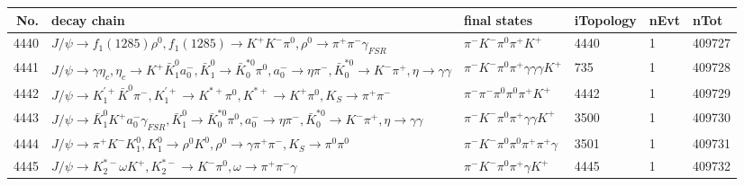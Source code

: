 \begin{table}[htbp] 
\begin{center}
\begin{small}
\begin{tabular}{rlllll}\hline\hline
 No. & decay chain & final states &  iTopology & nEvt & nTot \\\hline
4440&$J/\psi       \rightarrow f_{1}(1285)    \rho^{0}      , f_{1}(1285)     \rightarrow K^{+}          K^{-}          \pi^{0}        , \rho^{0}       \rightarrow \pi^{+}        \pi^{-}        \gamma_{FSR} $&$\pi^{-}        K^{-}          \pi^{0}        \pi^{+}        K^{+}          $& 4440&    1&409727\\
4441&$J/\psi       \rightarrow \gamma       \eta_{c}    , \eta_{c}     \rightarrow K^{+}          \bar{K}_1^{0} a_{0}^{-}      , \bar{K}_1^{0}  \rightarrow \bar{K}_0^{*0}\pi^{0}        , a_{0}^{-}       \rightarrow \eta          \pi^{-}        , \bar{K}_0^{*0} \rightarrow K^{-}          \pi^{+}        , \eta           \rightarrow \gamma       \gamma       $&$\pi^{-}        K^{-}          \pi^{0}        \pi^{+}        \gamma       \gamma       \gamma       K^{+}          $&  735&    1&409728\\
4442&$J/\psi       \rightarrow K_1^{'+}      \bar{K}^{0}   \pi^{-}        , K_1^{'+}       \rightarrow K^{*+}         \pi^{0}        , K^{*+}          \rightarrow K^{+}          \pi^{0}        , K_{S}           \rightarrow \pi^{+}        \pi^{-}        $&$\pi^{-}        \pi^{-}        \pi^{0}        \pi^{0}        \pi^{+}        K^{+}          $& 4442&    1&409729\\
4443&$J/\psi       \rightarrow \bar{K}_1^{0} K^{+}          a_{0}^{-}      \gamma_{FSR} , \bar{K}_1^{0}  \rightarrow \bar{K}_0^{*0}\pi^{0}        , a_{0}^{-}       \rightarrow \eta          \pi^{-}        , \bar{K}_0^{*0} \rightarrow K^{-}          \pi^{+}        , \eta           \rightarrow \gamma       \gamma       $&$\pi^{-}        K^{-}          \pi^{0}        \pi^{+}        \gamma       \gamma       K^{+}          $& 3500&    1&409730\\
4444&$J/\psi       \rightarrow \pi^{+}        K^{-}          K_1^{0}        , K_1^{0}         \rightarrow \rho^{0}      K^{0}          , \rho^{0}       \rightarrow \gamma       \pi^{+}        \pi^{-}        , K_{S}           \rightarrow \pi^{0}        \pi^{0}        $&$\pi^{-}        K^{-}          \pi^{0}        \pi^{0}        \pi^{+}        \pi^{+}        \gamma       $& 3501&    1&409731\\
4445&$J/\psi       \rightarrow K_2^{*-}       \omega         K^{+}          , K_2^{*-}        \rightarrow K^{-}          \pi^{0}        , \omega          \rightarrow \pi^{+}        \pi^{-}        \gamma       $&$\pi^{-}        K^{-}          \pi^{0}        \pi^{+}        \gamma       K^{+}          $& 4445&    1&409732\\

\end{tabular}
\end{small}
\end{center}
\end{table}
